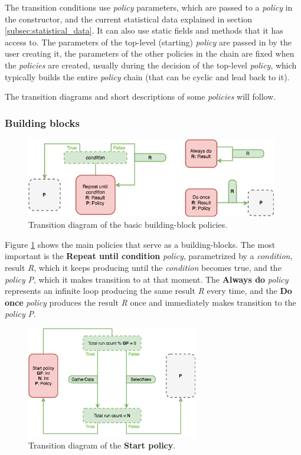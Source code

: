 The transition conditions use \textit{policy} parameters, which are passed to a \textit{policy} in the constructor, and the current statistical data explained in section \ref{subsec:statistical_data}. It can also use static fields and methods that it has access to. The parameters of the top-level (starting) \textit{policy} are passed in by the user creating it, the parameters of the other policies in the chain are fixed when the \textit{policies} are created, usually during the decision of the top-level \textit{policy}, which typically builds the entire \textit{policy} chain (that can be cyclic and lead back to it).

The transition diagrams and short descriptions of some \textit{policies} will follow.

\subsubsection{Building blocks}

\begin{figure}[h!]
	\captionsetup{justification=centering,margin=0.5cm}
	\centerline{\mbox{\includegraphics[width=110mm]{./img/helper_policies.png}}}
	\caption{Transition diagram of the basic building-block policies.}
	\label{fig:helper_policies}
\end{figure}

Figure \ref{fig:helper_policies} shows the main policies that serve as a building-blocks. The most important is the \textbf{Repeat until condition} \textit{policy}, parametrized by a \textit{condition}, result \textit{R}, which it keeps producing until the \textit{condition} becomes true, and the \textit{policy} \textit{P}, which it makes transition to at that moment. The \textbf{Always do} \textit{policy} represents an infinite loop producing the same result \textit{R} every time, and the \textbf{Do once} \textit{policy} produces the result \textit{R} once and immediately makes transition to the \textit{policy} \textit{P}.

\begin{figure}[h!]
	\captionsetup{justification=centering,margin=0.5cm}
	\centerline{\mbox{\includegraphics[width=75mm]{./img/start_policy.png}}}
	\caption{Transition diagram of the \textbf{Start policy}.}
	\label{fig:start_policy}
\end{figure}

